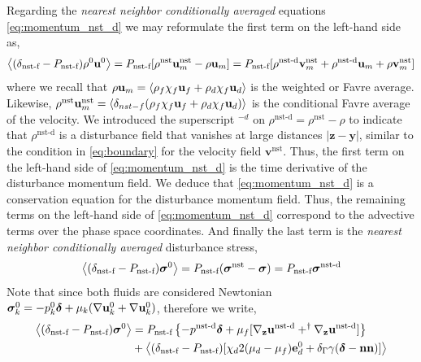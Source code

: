 Regarding the \textit{nearest neighbor conditionally averaged} equations \eqref{eq:momentum_nst_d} we may reformulate the first term on the left-hand side as, 
\begin{equation}
    \left<(\delta_\text{nst-f} - P_\text{nst-f})\rho^0 \textbf{u}^0\right>
    = P_\text{nst-f} [
        \rho^\text{nst}\textbf{u}_m^\text{nst}
        - 
        \rho \textbf{u}_m
    ]
    = P_\text{nst-f} [
        \rho^\text{nst-d}\textbf{v}^\text{nst}_m
        + \rho^\text{nst-d}\textbf{u}_m
        + \rho \textbf{v}^\text{nst}_m
    ]
\end{equation}
where we recall that $\rho \textbf{u}_m = \left<\rho_f\chi_f \textbf{u}_f + \rho_d\chi_f  \textbf{u}_d\right>$ is the weighted or Favre average.
Likewise, $\rho^\text{nst} \textbf{u}_m^\text{nst} = \left<\delta_{nst-f}(\rho_f\chi_f \textbf{u}_f + \rho_d\chi_f  \textbf{u}_d)\right>$ is the conditional Favre average of the velocity. 
We introduced the superscript $^{-d}$ on $\rho^\text{nst-d} = \rho^\text{nst} - \rho$ to indicate that $\rho^\text{nst-d}$ is a disturbance field that vanishes at large distances  $|\textbf{z} - \textbf{y}|$, similar to the condition in \ref{eq:boundary} for the velocity field $\textbf{v}^\text{nst}$. 
Thus, the first term on the left-hand side of \ref{eq:momentum_nst_d} is the time derivative of the disturbance momentum field. 
We deduce that \ref{eq:momentum_nst_d} is a conservation equation for the disturbance momentum field.
Thus, the remaining terms on the left-hand side of \ref{eq:momentum_nst_d} correspond to the advective terms over the phase space coordinates.
And finally the last term is the \textit{nearest neighbor conditionally averaged} disturbance stress,  
\begin{equation}
    \left<(\delta_\text{nst-f} - P_\text{nst-f}) \bm\sigma^0\right>
    = P_\text{nst-f} (\bm\sigma^\text{nst} - \bm\sigma)
    = P_\text{nst-f} \bm\sigma^\text{nst-d}
\end{equation}
Note that since both fluids are considered Newtonian $\bm\sigma_k^0 = -p_k^0\bm\delta + \mu_k (\mathbf{\nabla} \textbf{u}_k^0 + \mathbf{\nabla} \textbf{u}_k^0)$, therefore we write,
\begin{align}
    \avg{(\delta_\text{nst-f} - P_\text{nst-f}) \bm\sigma^0}
    &=
    P_\text{nst-f}\left\{
        -p^\text{nst-d}\bm\delta 
        + \mu_f [\pddz \textbf{u}^\text{nst-d}+^\dagger\pddz \textbf{u}^\text{nst-d}]
    \right\}\nonumber\\
   &+  \avg{(\delta_\text{nst-f} - P_\text{nst-f})[
    \chi_d  2 (\mu_d-\mu_f)\textbf{e}_d^0 
    + \delta_\Gamma \gamma (\bm\delta - \textbf{nn})]
    }
    \label{eq:stress_nst}
\end{align}
